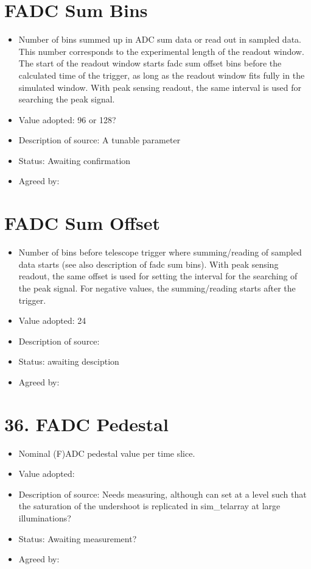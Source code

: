\documentclass[GCT,short]{gct}
\begin{document}
\section{FADC Sum Bins }
\begin{itemize}
\item Number of bins summed up in ADC sum data or read out in sampled data. This number corresponds to the experimental length of the readout window. The start of the readout window starts fadc sum offset bins before the calculated time of the trigger, as long as the readout window fits fully in the simulated window. With peak sensing readout, the same interval is used for searching the peak signal.
\item Value adopted: 96 or 128?
\item Description of source: A tunable parameter
\item Status: \color{orange}Awaiting confirmation \color{black}
\item Agreed by: 
\end{itemize}

\section{FADC Sum Offset }
\begin{itemize}
\item Number of bins before telescope trigger where summing/reading of sampled data starts (see also description of fadc sum bins). With peak sensing readout, the same offset is used for setting the interval for the searching of the peak signal. For negative values, the summing/reading starts after the trigger.
\item Value adopted: 24
\item Description of source: 
\item Status: \color{red}awaiting desciption\color{black}
\item Agreed by: 
\end{itemize}

\section{36. FADC Pedestal }
\begin{itemize}
\item Nominal (F)ADC pedestal value per time slice.
\item Value adopted: 
\item Description of source: Needs measuring, although can set at a level such that the saturation of the undershoot is replicated in sim\_telarray at large illuminations? 
\item Status: \color{red}Awaiting measurement?\color{black}
\item Agreed by: 
\end{itemize}
\end{document}
